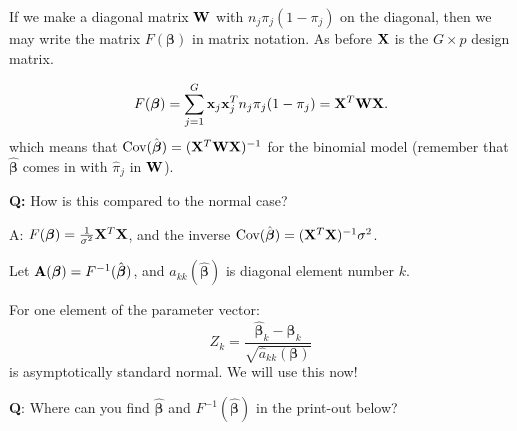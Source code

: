 \documentclass[
  ignorenonframetext,
]{beamer}
\begin{document}
\begin{frame}
If we make a diagonal matrix \({\bf W}\) with \(n_j \pi_j (1-\pi_j)\) on
the diagonal, then we may write the matrix \(F(\boldsymbol{\beta})\) in
matrix notation. As before \({\bf X}\) is the \(G\times p\) design
matrix.

\[F(\boldsymbol{\beta})=\sum_{j=1}^G {\bf x}_j {\bf x}_j^T n_j \pi_j (1-\pi_j)={\bf X}^T {\bf W} {\bf X}.\]
which means that
\(\text{Cov}(\hat{\boldsymbol{\beta}})=({\bf X}^T {\bf W} {\bf X})^{-1}\)
for the binomial model (remember that \(\hat{\boldsymbol{\beta}}\) comes
in with \(\hat{\pi}_j\) in \({\bf W}\)).

\textbf{Q:} How is this compared to the normal case?

A: \(F(\boldsymbol{\beta})=\frac{1}{\sigma^2}{\bf X}^T{\bf X}\), and the
inverse
\(\text{Cov}(\hat{\boldsymbol{\beta}})=({\bf X}^T {\bf X})^{-1}\sigma^2\).
\end{frame}

\begin{frame}
Let \({\bf A}(\boldsymbol{\beta})=F^{-1}(\hat{\boldsymbol{\beta}})\),
and \(a_{kk}(\hat{\boldsymbol{\beta}})\) is diagonal element number
\(k\).

For one element of the parameter vector:
\[ Z_k=\frac{\hat{\boldsymbol{\beta}}_k-\boldsymbol{\beta}_k}{\sqrt{\hat{a}_{kk}({\boldsymbol{\beta}})}}\]
is asymptotically standard normal. We will use this now!

\textbf{Q}: Where can you find \(\hat{\boldsymbol{\beta}}\) and
\(F^{-1}(\hat{\boldsymbol{\beta}})\) in the print-out below?
\end{frame}
\end{document}
